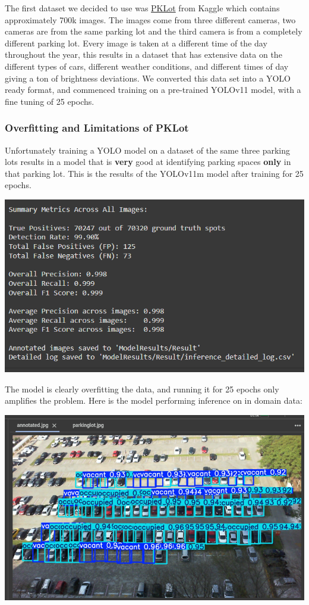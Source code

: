 \documentclass[12pt, letterpaper, oneside]{article}
\begin{document}
The first dataset we decided to use was \href{https://www.kaggle.com/datasets/ammarnassanalhajali/pklot-dataset}{PKLot} from Kaggle which contains approximately 700k images. The images come from three different cameras, two cameras are from the same parking lot and the third camera is from a completely different parking lot. Every image is taken at a different time of the day throughout the year, this results in a dataset that has extensive data on the different types of cars, different weather conditions, and different times of day giving a ton of brightness deviations. We converted this data set into a YOLO ready format, and commenced training on a pre-trained YOLOv11 model, with a fine tuning of 25 epochs.

\subsubsection{Overfitting and Limitations of PKLot}
Unfortunately training a YOLO model on a dataset of the same three parking lots results in a model that is \textbf{very} good at identifying parking spaces \textbf{only} in that parking lot. This is the results of the YOLOv11m model after training for 25 epochs. 

\includegraphics[scale=0.5]{pklot-25epochs-medium-results.png}

The model is clearly overfitting the data, and running it for 25 epochs only amplifies the problem. Here is the model performing inference on in domain data:

\includegraphics[scale=0.5]{report-images/pklot-25epochs-medium-inference.png}
\end{document}
